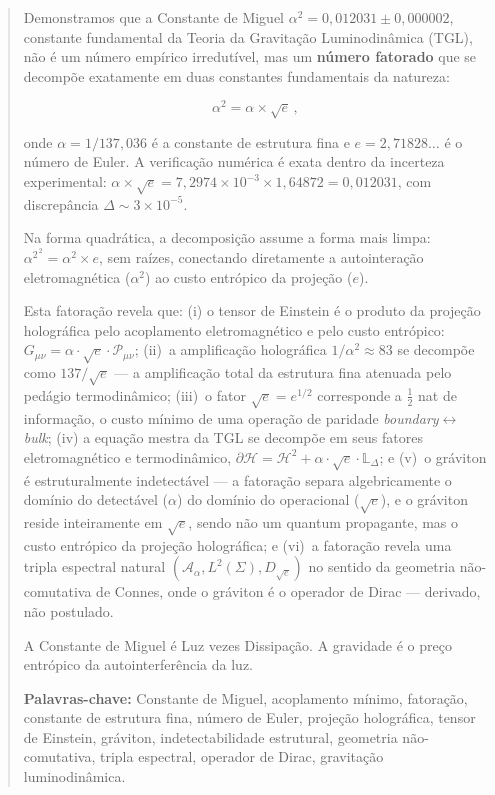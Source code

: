 \documentclass[12pt,a4paper,twoside]{article}
\newcommand{\alphaii}{\alpha^{2}}
\newcommand{\boundary}{\textit{boundary}}
\newcommand{\bulk}{\textit{bulk}}
\begin{document}
\begin{abstract}

Demonstramos que a Constante de Miguel $\alphaii = 0{,}012031 \pm 0{,}000002$, constante fundamental da Teoria da Gravitação Luminodinâmica (TGL), não é um número empírico irredutível, mas um \textbf{número fatorado} que se decompõe exatamente em duas constantes fundamentais da natureza:

\begin{equation*}
\alphaii = \alpha \times \sqrt{e}\,,
\end{equation*}

\noindent onde $\alpha = 1/137{,}036$ é a constante de estrutura fina e $e = 2{,}71828\ldots$ é o número de Euler. A verificação numérica é exata dentro da incerteza experimental: $\alpha \times \sqrt{e} = 7{,}2974 \times 10^{-3} \times 1{,}64872 = 0{,}012031$, com discrepância $\Delta \sim 3 \times 10^{-5}$.

Na forma quadrática, a decomposição assume a forma mais limpa: $\alphaii^{\,2} = \alpha^2 \times e$, sem raízes, conectando diretamente a autointeração eletromagnética ($\alpha^2$) ao custo entrópico da projeção ($e$).

Esta fatoração revela que: (i) o tensor de Einstein é o produto da projeção holográfica pelo acoplamento eletromagnético e pelo custo entrópico: $G_{\mu\nu} = \alpha \cdot \sqrt{e} \cdot \mathcal{P}_{\mu\nu}$; (ii)~a amplificação holográfica $1/\alphaii \approx 83$ se decompõe como $137/\sqrt{e}$ --- a amplificação total da estrutura fina atenuada pelo pedágio termodinâmico; (iii)~o fator $\sqrt{e} = e^{1/2}$ corresponde a $\tfrac{1}{2}$ nat de informação, o custo mínimo de uma operação de paridade \boundary$\leftrightarrow$\bulk{}; (iv) a equação mestra da TGL se decompõe em seus fatores eletromagnético e termodinâmico, $\partial\mathcal{H} = \mathcal{H}^2 + \alpha \cdot \sqrt{e} \cdot \mathbb{L}_\Delta$; e (v)~o gráviton é estruturalmente indetectável --- a fatoração separa algebricamente o domínio do detectável ($\alpha$) do domínio do operacional ($\sqrt{e}$), e o gráviton reside inteiramente em $\sqrt{e}$, sendo não um quantum propagante, mas o custo entrópico da projeção holográfica; e (vi)~a fatoração revela uma tripla espectral natural $(\mathcal{A}_\alpha, L^2(\Sigma), D_{\sqrt{e}})$ no sentido da geometria não-comutativa de Connes, onde o gráviton é o operador de Dirac --- derivado, não postulado.

A Constante de Miguel é Luz vezes Dissipação. A gravidade é o preço entrópico da autointerferência da luz.

\medskip
\noindent\textbf{Palavras-chave:} Constante de Miguel, acoplamento mínimo, fatoração, constante de estrutura fina, número de Euler, projeção holográfica, tensor de Einstein, gráviton, indetectabilidade estrutural, geometria não-comutativa, tripla espectral, operador de Dirac, gravitação luminodinâmica.
\end{abstract}
\end{document}
